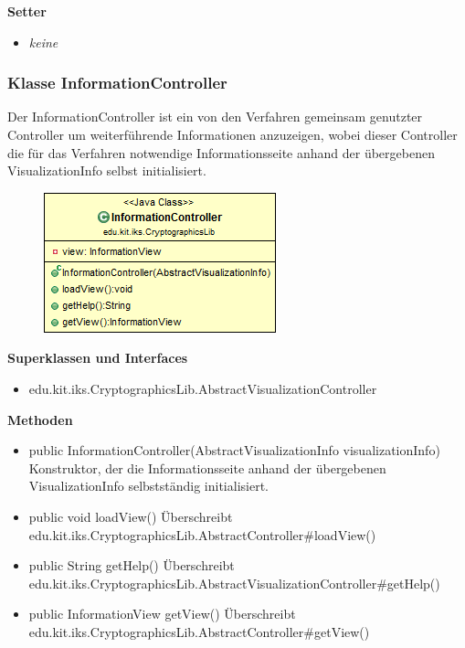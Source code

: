 \documentclass{article}
\begin{document}
      \textbf{Setter}
      \begin{itemize}
        \item \textit{keine}
      \end{itemize}
	
	\subsubsection{Klasse InformationController}
	  Der InformationController ist ein von den Verfahren gemeinsam genutzter
	  Controller um weiterführende Informationen anzuzeigen, wobei dieser Controller
	  die für das Verfahren notwendige Informationsseite anhand der übergebenen VisualizationInfo
	  selbst initialisiert.
	
      \begin{figure}[H]
        \centering
        \includegraphics{resources/edu-kit-iks-CryptographicsLib-InformationController}
      \end{figure}
	
      \textbf{Superklassen und Interfaces}
      \begin{itemize}
        \item edu.kit.iks.CryptographicsLib.AbstractVisualizationController
      \end{itemize}
	
      \textbf{Methoden}
      \begin{itemize}
        \item public InformationController(AbstractVisualizationInfo visualizationInfo) \newline
          Konstruktor, der die Informationsseite anhand der übergebenen VisualizationInfo
          selbstständig initialisiert.
		\item public void loadView() \newline
		  Überschreibt edu.kit.iks.CryptographicsLib.AbstractController\#loadView()
		\item public String getHelp() \newline
		  Überschreibt edu.kit.iks.CryptographicsLib.AbstractVisualizationController\#getHelp()
		\item public InformationView getView() \newline
		  Überschreibt edu.kit.iks.CryptographicsLib.AbstractController\#getView()
      \end{itemize}
      
\end{document}

